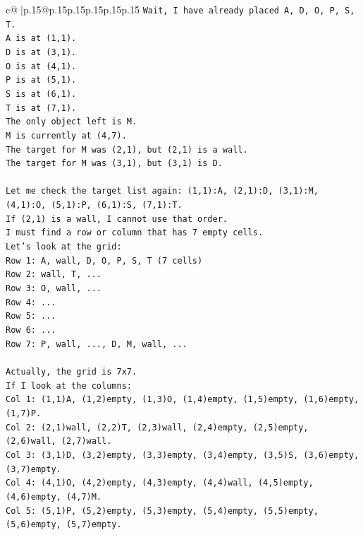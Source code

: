\documentclass{article}
\begin{document}
{\begin{supertabular}{c@{$\;$}|p{.15\linewidth}@{}p{.15\linewidth}p{.15\linewidth}p{.15\linewidth}p{.15\linewidth}p{.15\linewidth}}
{{{\texttt{Wait, I have already placed A, D, O, P, S, T.} \\
\texttt{A is at (1,1).} \\
\texttt{D is at (3,1).} \\
\texttt{O is at (4,1).} \\
\texttt{P is at (5,1).} \\
\texttt{S is at (6,1).} \\
\texttt{T is at (7,1).} \\
\texttt{The only object left is M.} \\
\texttt{M is currently at (4,7).} \\
\texttt{The target for M was (2,1), but (2,1) is a wall.} \\
\texttt{The target for M was (3,1), but (3,1) is D.} \\
\\ 
\texttt{Let me check the target list again: (1,1):A, (2,1):D, (3,1):M, (4,1):O, (5,1):P, (6,1):S, (7,1):T.} \\
\texttt{If (2,1) is a wall, I cannot use that order.} \\
\texttt{I must find a row or column that has 7 empty cells.} \\
\texttt{Let's look at the grid:} \\
\texttt{Row 1: A, wall, D, O, P, S, T (7 cells)} \\
\texttt{Row 2: wall, T, ...} \\
\texttt{Row 3: O, wall, ...} \\
\texttt{Row 4: ...} \\
\texttt{Row 5: ...} \\
\texttt{Row 6: ...} \\
\texttt{Row 7: P, wall, ..., D, M, wall, ...} \\
\\ 
\texttt{Actually, the grid is 7x7.} \\
\texttt{If I look at the columns:} \\
\texttt{Col 1: (1,1)A, (1,2)empty, (1,3)O, (1,4)empty, (1,5)empty, (1,6)empty, (1,7)P.} \\
\texttt{Col 2: (2,1)wall, (2,2)T, (2,3)wall, (2,4)empty, (2,5)empty, (2,6)wall, (2,7)wall.} \\
\texttt{Col 3: (3,1)D, (3,2)empty, (3,3)empty, (3,4)empty, (3,5)S, (3,6)empty, (3,7)empty.} \\
\texttt{Col 4: (4,1)O, (4,2)empty, (4,3)empty, (4,4)wall, (4,5)empty, (4,6)empty, (4,7)M.} \\
\texttt{Col 5: (5,1)P, (5,2)empty, (5,3)empty, (5,4)empty, (5,5)empty, (5,6)empty, (5,7)empty.} \\
}}}
\end{supertabular}}
\end{document}
